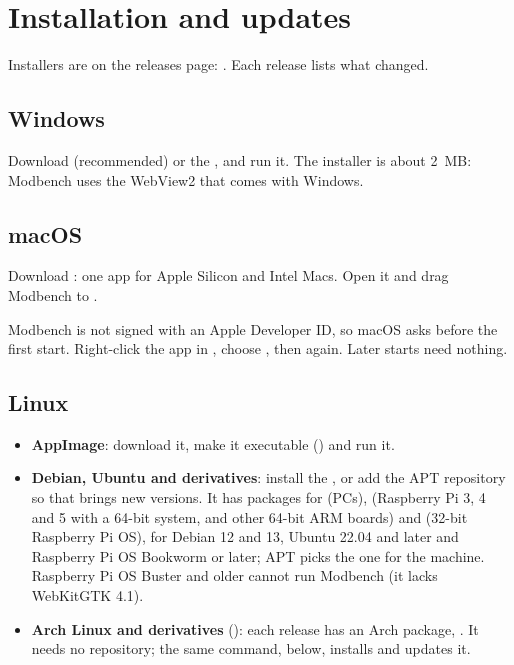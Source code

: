 \chapter{Installation and updates}

Installers are on the releases page:
. Each release lists what changed.

\section{Windows}

Download  (recommended) or the
, and run it. The installer is about 2~MB: Modbench uses the
WebView2 that comes with Windows.

\section{macOS}

Download : one app for Apple Silicon and
Intel Macs. Open it and drag Modbench to .

\begin{note}
Modbench is not signed with an Apple Developer ID, so macOS asks before the
first start. Right-click the app in , choose , then
 again. Later starts need nothing.
\end{note}

\section{Linux}
\label{sec:linux-install}

\begin{itemize}
  \item \textbf{AppImage}: download it, make it executable
        () and run it.
  \item \textbf{Debian, Ubuntu and derivatives}: install the , or
        add the APT repository so that  brings new versions.
        It has packages for  (PCs),  (Raspberry Pi 3,
        4 and 5 with a 64-bit system, and other 64-bit ARM boards) and
         (32-bit Raspberry Pi OS), for Debian 12 and 13, Ubuntu
        22.04 and later and Raspberry Pi OS Bookworm or later; APT picks the
        one for the machine. Raspberry Pi OS Buster and older cannot run
        Modbench (it lacks WebKitGTK 4.1).
  \item \textbf{Arch Linux and derivatives} (): each release has
        an Arch package, . It needs no
        repository; the same command, below, installs and updates it.
\end{itemize}

